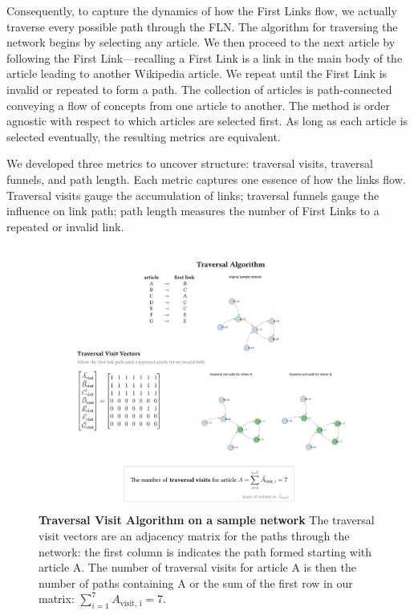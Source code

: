 \documentclass[pre,twocolumn,twoside,superscriptaddress,floatfix, aps, 10pt]{revtex4-1}
\begin{document}
Consequently, to capture the dynamics of how the First Links flow, we actually traverse every possible path through the FLN. 
The algorithm for traversing the network begins by selecting any article. 
We then proceed to the next article by following the First Link---recalling a First Link is a link in the main body of the article leading to another Wikipedia article. 
We repeat until the First Link is invalid or repeated to form a path. 
The collection of articles is path-connected conveying a flow of concepts from one article to another. 
The method is order agnostic with respect to which articles are selected first.
As long as each article is selected eventually, the resulting metrics are equivalent.

We developed three metrics to uncover structure: 
traversal visits, traversal funnels, and path length. 
Each metric captures one essence of how the links flow. 
Traversal visits gauge the accumulation of links; 
traversal funnels gauge the influence on link path; 
path length measures the number of First Links to a repeated or invalid link. 


\begin{figure}[tp!]
  \centering	
  \includegraphics[width=\textwidth]{graphics/traversal_visit_algo_figure.pdf}  
  \caption{
    \textbf{Traversal Visit Algorithm on a sample network}
     The traversal visit vectors are an adjacency matrix for the paths through the network: the first column is indicates the path formed starting with article A. The number of traversal visits for article A is then the number of paths containing A or the sum of the first row in our matrix:
     $\sum_{i=1}^7 A_{\text{visit, i}} = 7$.
  }
  \label{fig:Traversal Visits}
\end{figure}
\end{document}
